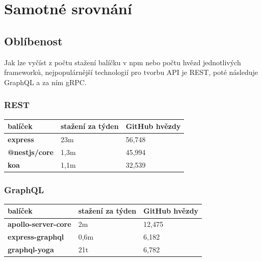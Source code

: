 \documentclass[thesis=M,czech]{FITthesis}[2019/12/23]
\begin{document}
\section{Samotné srovnání}

\subsection{Oblíbenost}
Jak lze vyčíst z počtu stažení balíčku v npm nebo počtu hvězd jednotlivých frameworků, nejpopulárnější technologií pro tvorbu API je REST, poté následuje GraphQL a za ním gRPC.

\subsubsection*{REST}
\begin{table}[H]
  \begin{tabular}{|l|l|l|}
  \hline
  \textbf{balíček}      & \textbf{stažení za týden} & \textbf{GitHub hvězdy} \\ \hline
  \textbf{express}      & 23m                       & 56,748                 \\ \hline
  \textbf{@nestjs/core} & 1,3m                      & 45,994                 \\ \hline
  \textbf{koa}          & 1,1m                      & 32,539                 \\ \hline
  \end{tabular}
\end{table}

\subsubsection*{GraphQL}
\begin{table}[H]
  \begin{tabular}{|l|l|l|}
  \hline
  \textbf{balíček}                                 & \textbf{stažení za týden}                           & \textbf{GitHub hvězdy} \\ \hline
  \textbf{apollo-server-core}                      & 2m                                                  & 12,475                 \\ \hline
  \textbf{express-graphql}                         & 0,6m                                                & 6,182                  \\ \hline
  \textbf{graphql-yoga}                            & 21t                                                 & 6,782                  \\ \hline
  \end{tabular}
\end{table}
\end{document}

